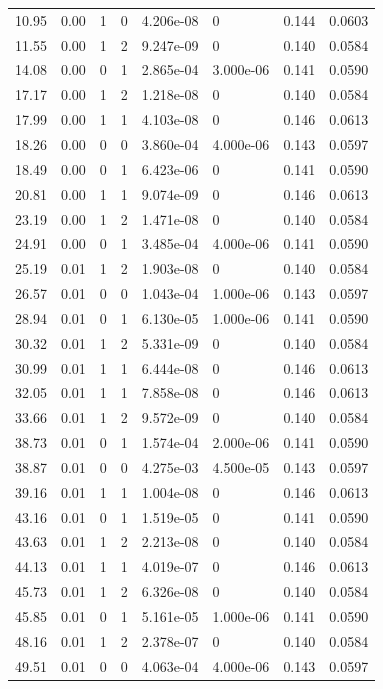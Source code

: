 \documentclass[preview]{standalone}
\begin{document}
{{\begin{tabular}{L{1.2cm}C{1.2cm} C{0.3cm}C{0.5cm} C{1.4cm}C{1.4cm} C{1.4cm}C{1.4cm}}
  10.95  &  0.00  & 1     &  0 &  4.206e-08  & 0  & 0.144 &  0.0603   \\ 
  11.55  &  0.00  & 1     &  2 &  9.247e-09  & 0  & 0.140 &  0.0584   \\ 
  14.08  &  0.00  & 0     &  1 &  2.865e-04  & 3.000e-06  & 0.141 &  0.0590   \\ 
  17.17  &  0.00  & 1     &  2 &  1.218e-08  & 0  & 0.140 &  0.0584   \\ 
  17.99  &  0.00  & 1     &  1 &  4.103e-08  & 0  & 0.146 &  0.0613   \\ 
  18.26  &  0.00  & 0     &  0 &  3.860e-04  & 4.000e-06  & 0.143 &  0.0597   \\ 
  18.49  &  0.00  & 0     &  1 &  6.423e-06  & 0  & 0.141 &  0.0590   \\ 
  20.81  &  0.00  & 1     &  1 &  9.074e-09  & 0  & 0.146 &  0.0613   \\ 
  23.19  &  0.00  & 1     &  2 &  1.471e-08  & 0  & 0.140 &  0.0584   \\ 
  24.91  &  0.00  & 0     &  1 &  3.485e-04  & 4.000e-06  & 0.141 &  0.0590   \\ 
  25.19  &  0.01  & 1     &  2 &  1.903e-08  & 0  & 0.140 &  0.0584   \\ 
  26.57  &  0.01  & 0     &  0 &  1.043e-04  & 1.000e-06  & 0.143 &  0.0597   \\ 
  28.94  &  0.01  & 0     &  1 &  6.130e-05  & 1.000e-06  & 0.141 &  0.0590   \\ 
  30.32  &  0.01  & 1     &  2 &  5.331e-09  & 0  & 0.140 &  0.0584   \\ 
  30.99  &  0.01  & 1     &  1 &  6.444e-08  & 0  & 0.146 &  0.0613   \\ 
  32.05  &  0.01  & 1     &  1 &  7.858e-08  & 0  & 0.146 &  0.0613   \\ 
  33.66  &  0.01  & 1     &  2 &  9.572e-09  & 0  & 0.140 &  0.0584   \\ 
  38.73  &  0.01  & 0     &  1 &  1.574e-04  & 2.000e-06  & 0.141 &  0.0590   \\ 
  38.87  &  0.01  & 0     &  0 &  4.275e-03  & 4.500e-05  & 0.143 &  0.0597   \\ 
  39.16  &  0.01  & 1     &  1 &  1.004e-08  & 0  & 0.146 &  0.0613   \\ 
  43.16  &  0.01  & 0     &  1 &  1.519e-05  & 0  & 0.141 &  0.0590   \\ 
  43.63  &  0.01  & 1     &  2 &  2.213e-08  & 0  & 0.140 &  0.0584   \\ 
  44.13  &  0.01  & 1     &  1 &  4.019e-07  & 0  & 0.146 &  0.0613   \\ 
  45.73  &  0.01  & 1     &  2 &  6.326e-08  & 0  & 0.140 &  0.0584   \\ 
  45.85  &  0.01  & 0     &  1 &  5.161e-05  & 1.000e-06  & 0.141 &  0.0590   \\ 
  48.16  &  0.01  & 1     &  2 &  2.378e-07  & 0  & 0.140 &  0.0584   \\ 
  49.51  &  0.01  & 0     &  0 &  4.063e-04  & 4.000e-06  & 0.143 &  0.0597   \\ 
\hline 
\end{tabular} 

}}
\end{document}
